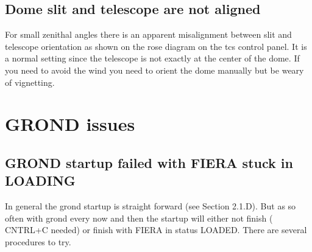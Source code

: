 \documentclass[11pt,fleqn,a4paper]{book}
\begin{document}
\subsection{Dome slit and telescope are not aligned}
For small zenithal angles there is an apparent misalignment between \gls{slit} and telescope orientation as shown on the \gls{rose diagram} on the \gls{tcs} control panel. It is a normal setting since the telescope is not exactly at the center of the \gls{dome}.  If you need to avoid the wind you need to orient the \gls{dome} manually but be weary of vignetting.

\section{GROND issues}

\subsection{GROND startup failed with FIERA stuck in LOADING}
 In general the \gls{grond} startup is straight forward (see Section 2.1.D). But as so often with \gls{grond} every now and then the startup will either not finish ( CNTRL+C needed) or finish with FIERA in status LOADED. There are several procedures to try.
 
\end{document}
